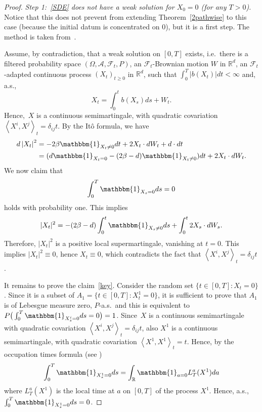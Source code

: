 \documentclass[a4paper,10pt]{article}
\newcommand\1{\mathbbm{1}}
\numberwithin{equation}{section}
\begin{document}
\begin{proof}
\emph{Step 1:~\eqref{SDE} does not have a weak solution for $X_0=0$ \textup{(}for any $T>0$\textup{)}.} Notice that this does not prevent from extending Theorem~\ref{2pathwise} to this case (because the initial datum is concentrated on $0$), but it is a first step. The method is taken from~\cite{Cerny Engelbert}.

Assume, by contradiction, that a weak solution on $[0,T]$ exists, i.e.~there is a filtered probability space $(\Omega,\mathcal{A},\mathcal{F}_{t},P)$, an $\mathcal{F}_{t}$-Brownian motion $W$ in $\mathbb{R}^{d}$, an $\mathcal{F} _{t}$-adapted continuous process $(X_{t})_{t\geq0}$ in
$\mathbb{R}^{d}$, such that $ \int_{0}^{T} \vert b(X_{t}) \vert dt<\infty$ and, a.s.,
\begin{equation*}
X_{t}=\int_{0}^{t}b(X_{s}) ds+W_{t} .
\end{equation*}
Hence,~$X$ is a continuous semimartingale, with quadratic covariation $\left\langle X^{i},X^{j}\right\rangle _{t}=\delta_{ij}t$. By the It\^{o} formula, we have
\begin{align*}
d\left\vert X_{t}\right\vert ^{2}  & =-2\beta \1_{X_{t}\neq0}dt+2X_{t}\cdot
dW_{t}+d\cdot dt\\
& =(d \1_{X_{t}=0}-(2\beta-d) \1_{X_{t}\neq0})dt+2X_{t}\cdot dW_{t}.
\end{align*}
We now claim that
\begin{equation}
\int_{0}^{T} \1_{X_{s}=0}ds=0\label{key} 
\end{equation}
holds with probability one. This implies
\begin{equation*}
\vert X_{t} \vert ^{2}=-(2\beta-d)\int^t_0 \1_{X_{s}\neq0}ds+\int_{0}^{t}2X_{s}\cdot dW_{s}.
\end{equation*}
Therefore, $\vert X_{t} \vert^{2}$ is a positive local supermartingale, vanishing at $t=0$. This implies $\vert X_{t} \vert^{2}\equiv0$, hence $X_{t}\equiv0$, which contradicts the fact that $\left\langle X^{i},X^{j}\right\rangle _{t}=\delta_{ij}t$. 

It remains to prove the claim~\eqref{key}. Consider the random set $\{ t\in [0,T] \colon X_{t}=0\}$. Since it is a subset of $A_{1}=\{ t\in [0,T] \colon X_{t}^{1}=0 \}$, it is sufficient to prove that $A_{1}$ is of Lebesgue measure zero, $P$-a.s.~and this is equivalent to $P\big(\int_{0}^{T}  \1_{X_{s}^{i}=0}ds=0 \big)=1$. Since~$X$ is a continuous semimartingale with quadratic covariation $\left\langle X^{i},X^{j}\right\rangle _{t}=\delta_{ij}t$, also $X^{1}$ is a continuous semimartingale, with quadratic covariation $\left\langle X^{1},X^{1} \right\rangle _{t}=t$. Hence, by the occupation times formula (see
\cite[Chapter~VI, Corollary~1.6]{RevuzYor})
\begin{equation*}
\int_{0}^{T} \1_{X_{s}^{1}=0}ds=\int_{\mathbb{R}} \1_{a=0}L_{T}^{a}(X^{1})  da
\end{equation*}
where $L_{T}^{a}( X^{1})$ is the local time at $a$ on $[
0,T]  $ of the process $X^{1}$. Hence, a.s.,  $\int_{0}^{T} \1_{X_{s}^{1}=0}ds=0$. 


\end{proof}
\end{document}
